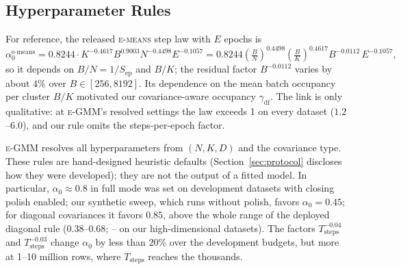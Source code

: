 \documentclass[10pt]{article} %
\newcommand{\egmm}{\textsc{e-GMM}}
\newcommand{\emeans}{\textsc{e-means}}
\begin{document}
\subsection{Hyperparameter Rules}
\label{app:rules}

For reference, the released \emeans{} step law with $E$ epochs is
\begin{equation}
\alpha_0^{\text{e-means}} = 0.8244 \cdot K^{-0.4617} B^{0.9003} N^{-0.4498} E^{-0.1057} = 0.8244 \left(\tfrac{B}{N}\right)^{0.4498} \left(\tfrac{B}{K}\right)^{0.4617} B^{-0.0112}\, E^{-0.1057},
\label{eq:emeans_alpha}
\end{equation}
so it depends on $B/N = 1/S_{\mathrm{ep}}$ and $B/K$; the residual factor $B^{-0.0112}$ varies by about $4\%$ over $B \in [256, 8192]$. Its dependence on the mean batch occupancy per cluster $B/K$ motivated our covariance-aware occupancy $\gamma_{\mathrm{df}}$. The link is only qualitative: at \egmm{}'s resolved settings the law exceeds 1 on every dataset ($1.2$--$6.0$), and our rule omits the steps-per-epoch factor.

\egmm{} resolves all hyperparameters from $(N, K, D)$ and the covariance type. These rules are hand-designed heuristic defaults (Section~\ref{sec:protocol} discloses how they were developed); they are not the output of a fitted model. In particular, $\alpha_0 \approx 0.8$ in full mode was set on development datasets with closing polish enabled; our synthetic sweep, which runs without polish, favors $\alpha_0 = 0.45$; for diagonal covariances it favors $0.85$, above the whole range of the deployed diagonal rule ($0.38$--$0.68$; \rXDiagAlphaLo--\rXDiagAlphaHi{} on our high-dimensional datasets). The factors $T_{\mathrm{steps}}^{-0.04}$ and $T_{\mathrm{steps}}^{-0.03}$ change $\alpha_0$ by less than $20\%$ over the development budgets, but more at 1--10 million rows, where $T_{\mathrm{steps}}$ reaches the thousands.
\end{document}
